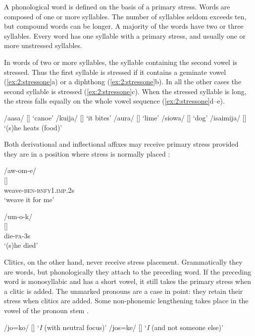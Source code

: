 A phonological word is defined on the basis of a primary stress. Words are composed of one or more syllables. The number of syllables seldom exceeds ten, but compound words can be longer. A majority of the words have two or three syllables.  Every word has one syllable with a primary stress, and usually one or more unstressed syllables. 

In words of two or more syllables, the syllable containing the second vowel is stressed. Thus the first syllable is stressed if it contains a geminate vowel (\ref{ex:2:stressone}a) or a diphthong (\ref{ex:2:stressone}b). In all the other cases the second syllable is stressed (\ref{ex:2:stressone}c). When the stressed syllable is long, the stress falls equally on the whole vowel sequence (\ref{ex:2:stressone}d--e). 

\ea
\label{ex:2:stressone}
\ea
/aasa/  []  `canoe'
\ex
/kuija/  []  `it bites'
\ex
/a{\textphi}ura/  []  `lime'
\ex
/siowa/  []  `dog'
\ex
/isaimija/  []  `(s)he heats (food)'
\z
\z

Both derivational and inflectional affixes may receive primary stress provided they are in a position where stress is normally placed :

\ea
\label{ex:2:stresstwo}
\ea
  /aw-om-e/\\
  {}[]  \\
weave-\textsc{ben}-\textsc{bnfy1}.\textsc{imp}.2s\\
\glt `weave it for me' 

\ex
  /um-o-k/ \\
 {}[]  \\
die-\textsc{pa}-3s \\
\glt `(s)he died'
\z
\z



Clitics, on the other hand, never receive stress placement. Grammatically they are words, but phonologically they attach to the preceding word. If the preceding word is monosyllabic and has a short vowel, it still takes the primary stress when a clitic is added. The unmarked pronouns are a case in point: they retain their stress when clitics are added. Some non-phonemic lengthening takes place in the vowel of the pronoun stem .

\ea
\label{ex:2:stressthree}
\ea
/jo=ko/  []  `\textit{I} (with neutral focus)'
\ex
/jos=ke/  []  `\textit{I} (and not someone else)' 
\z
\z

